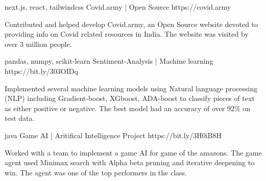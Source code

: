 \begin{cventries}

\vspace{-1.0mm}
  \cventry
    {next.js, react, tailwindcss} %
    {Covid.army | Open Source} %
    {https://covid.army} %
    {} %
    {
      \begin{cvitems} %
        \item {Contributed and helped develop Covid.army, an Open Source website devoted to providing info on Covid related resources in India. The website was visited by over 3 million people.} 
      \end{cvitems}
    }
\vspace{-1.0mm}
  \cventry
    {pandas, numpy, scikit-learn} %
    {Sentiment-Analysis | Machine learning} %
    {https://bit.ly/303OIDq} %
    {} %
    {
      \begin{cvitems} %
        \item {Implemented several machine learning models using Natural language processing (NLP) including Gradient-boost, XGboost, ADA-boost to classify pieces of text as either positive or negative. The best model had an accuracy of over 92\% on test data.} 
      \end{cvitems}
    }

\vspace{-1.0mm}
  \cventry
    {java} %
    {Game AI | Aritifical Intelligence Project} %
    {https://bit.ly/3H0iB8H} %
    {} %
    {
      \begin{cvitems} %
        \item {Worked with a team to implement a game AI for game of the amazons. The game agent used Minimax search with Alpha beta pruning and iterative deepening to win. The agent was one of the top performers in the class.}  
      \end{cvitems}
    }
\end{cventries}
